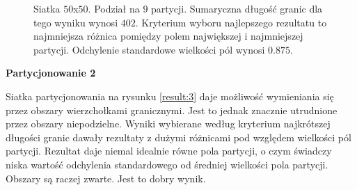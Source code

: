 \begin{figure}[h]
\begin{subfigure}{.33\textwidth}
    \caption[short]{}
\end{subfigure}
\caption{Siatka $50$x$50$. Podział na $9$ partycji. Sumaryczna długość granic dla tego wyniku wynosi $402$.
Kryterium wyboru najlepszego rezultatu to najmniejsza różnica pomiędzy polem największej i najmniejszej partycji.
Odchylenie standardowe wielkości pól wynosi $0.875$.}
\label{result:2}
\end{figure}

\newpage
\vspace{3mm}
\textbf{Partycjonowanie 2}
\vspace{1mm}

Siatka partycjonowania na rysunku \ref{result:3} daje możliwość wymieniania się przez obszary wierzchołkami granicznymi.
Jest to jednak znacznie utrudnione przez obszary niepodzielne.
Wyniki wybierane według kryterium najkrótszej długości granic dawały rezultaty z dużymi różnicami pod względem wielkości pól partycji.
Rezultat daje niemal idealnie równe pola partycji, o czym świadczy niska wartość odchylenia standardowego od średniej wielkości
pola partycji.
Obszary są raczej zwarte.
Jest to dobry wynik.

